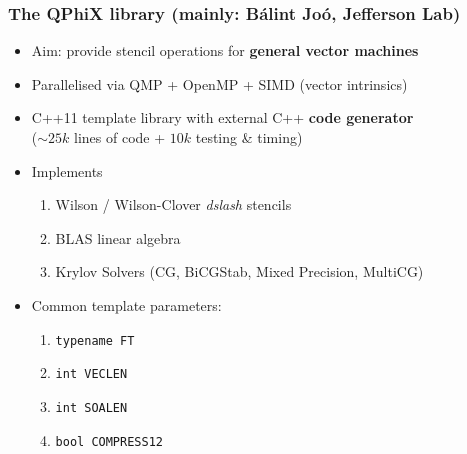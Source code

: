 \documentclass{beamer}
\begin{document}
  \begin{frame}
    \frametitle{The QPhiX library (mainly: Bálint Joó, Jefferson Lab)}

    \begin{itemize}
      \item Aim: provide stencil operations for \textbf{general vector machines}
        \vfill
      \item Parallelised via QMP + OpenMP + SIMD (vector intrinsics)
        \vfill
      \item C++11 template library with external C++ \textbf{code generator}\\
        ($\sim25k$ lines of code + $10k$ testing \& timing)
        \vfill
      \item Implements
        \begin{enumerate}
          \item Wilson / Wilson-Clover \textit{dslash} stencils
          \item BLAS linear algebra
          \item Krylov Solvers (CG, BiCGStab, Mixed Precision, MultiCG)
        \end{enumerate}
        \vfill
      \item Common template parameters:
        \begin{enumerate}
          \item \texttt{typename FT}
          \item \texttt{int VECLEN}
          \item \texttt{int SOALEN}
          \item \texttt{bool COMPRESS12}
        \end{enumerate}
        \vfill
    \end{itemize}

  \end{frame}

\end{document}
